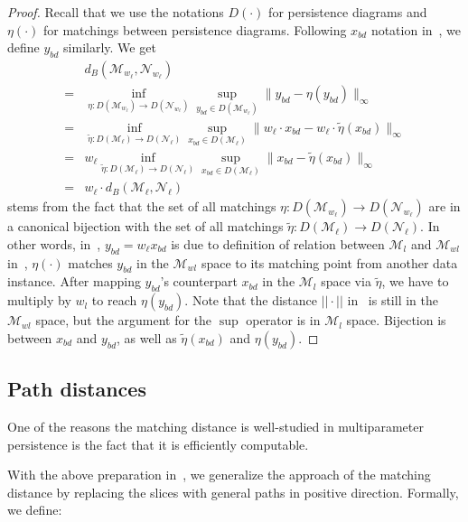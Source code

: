 \documentclass[sigconf, nonacm, natbib=false]{acmart} %
\def\M {{\mathcal{M}}}
\def\N {{\mathcal{N}}}
\theoremstyle{plain}
\begin{document}
\begin{proof}
Recall that we use the notations $D(\cdot)$ for  persistence diagrams and $\eta(\cdot)$ for matchings between persistence diagrams. Following $x_{bd}$ notation in~, we define $y_{bd}$ similarly.
We get
\begin{align}
&d_B(\M_{w_\ell},\N_{w_\ell}) \nonumber\\
  =& \inf_{\eta:D(\M_{w_\ell})\rightarrow D(\N_{w_\ell})} \sup_{y_{bd}\in D(\M_{w_\ell})} \lVert y_{bd} - \eta(y_{bd}) \rVert_\infty \\
  =& \inf_{\tilde\eta:D(\M_\ell)\rightarrow D(\N_\ell)} \sup_{x_{bd}\in D(\M_{\ell})} \lVert w_\ell\cdot x_{bd} - w_\ell\cdot \tilde\eta(x_{bd}) \rVert_\infty \label{eq:switch_diagram}\\
  =& w_\ell  \inf_{\tilde\eta:D(\M_\ell)\rightarrow D(\N_\ell)} \sup_{x_{bd}\in D(\M_\ell)}  \lVert x_{bd} - \tilde\eta(x_{bd}) \rVert_\infty\\
  =& w_\ell \cdot d_B(\M_\ell,\N_\ell)
\end{align}
 stems from the fact that the set of all matchings 
$\eta:D(\M_{w_\ell})\rightarrow D(\N_{w_\ell})$ 
are in a canonical bijection with the set of all matchings 
$\tilde\eta:D(\M_{\ell})\rightarrow D(\N_{\ell})$.
In other words, in~, $y_{bd}=w_{\ell}x_{bd}$ is due to definition of relation between $\mathcal{M}_{l}$ and $\mathcal{M}_{wl}$ in~, $\eta(\cdot)$ matches $y_{bd}$ in the $\mathcal{M}_{wl}$ space to its matching point from another data instance. 
After mapping $y_{bd}$'s counterpart $x_{bd}$ in the $\mathcal{M}_l$ space via $\tilde{\eta}$, we have to multiply by $w_l$ to reach $\eta(y_{bd})$. 
Note that the distance $||\cdot||$ in~ is still in the $\mathcal{M}_{wl}$ space, but the argument for the $\sup$ operator is in $\mathcal{M}_l$ space. Bijection is between $x_{bd}$ and $y_{bd}$, as well as $\tilde{\eta}(x_{bd})$ and $\eta(y_{bd})$.
\end{proof}

\subsection{Path distances}\label{sec:construction}
One of the reasons the matching distance is well-studied in multiparameter persistence is the fact that it is efficiently computable. 

With the above preparation in~, we generalize the approach of the matching distance by 
replacing the slices with general paths in positive direction. 
Formally, we define:
\end{document}
